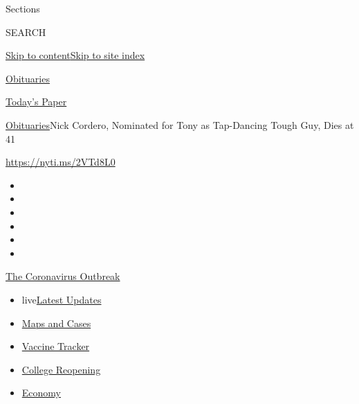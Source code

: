 Sections

SEARCH

\protect\hyperlink{site-content}{Skip to
content}\protect\hyperlink{site-index}{Skip to site index}

\href{https://www.nytimes.com/section/obituaries}{Obituaries}

\href{https://myaccount.nytimes.com/auth/login?response_type=cookie\&client_id=vi}{}

\href{https://www.nytimes.com/section/todayspaper}{Today's Paper}

\href{/section/obituaries}{Obituaries}\textbar{}Nick Cordero, Nominated
for Tony as Tap-Dancing Tough Guy, Dies at 41

\url{https://nyti.ms/2VTd8L0}

\begin{itemize}
\item
\item
\item
\item
\item
\item
\end{itemize}

\href{https://www.nytimes.com/news-event/coronavirus?action=click\&pgtype=Article\&state=default\&region=TOP_BANNER\&context=storylines_menu}{The
Coronavirus Outbreak}

\begin{itemize}
\tightlist
\item
  live\href{https://www.nytimes.com/2020/08/03/world/coronavirus-covid-19.html?action=click\&pgtype=Article\&state=default\&region=TOP_BANNER\&context=storylines_menu}{Latest
  Updates}
\item
  \href{https://www.nytimes.com/interactive/2020/us/coronavirus-us-cases.html?action=click\&pgtype=Article\&state=default\&region=TOP_BANNER\&context=storylines_menu}{Maps
  and Cases}
\item
  \href{https://www.nytimes.com/interactive/2020/science/coronavirus-vaccine-tracker.html?action=click\&pgtype=Article\&state=default\&region=TOP_BANNER\&context=storylines_menu}{Vaccine
  Tracker}
\item
  \href{https://www.nytimes.com/2020/08/02/us/covid-college-reopening.html?action=click\&pgtype=Article\&state=default\&region=TOP_BANNER\&context=storylines_menu}{College
  Reopening}
\item
  \href{https://www.nytimes.com/live/2020/08/03/business/stock-market-today-coronavirus?action=click\&pgtype=Article\&state=default\&region=TOP_BANNER\&context=storylines_menu}{Economy}
\end{itemize}

